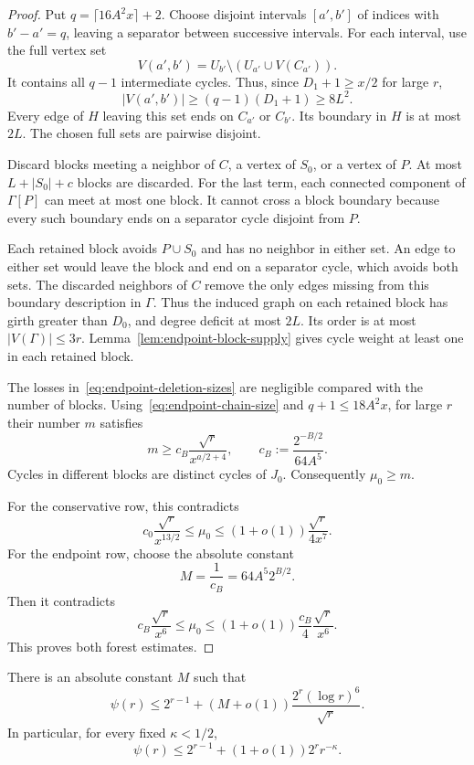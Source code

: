 \begin{proof}
Put $q=\lceil16A^2x\rceil+2$.
Choose disjoint intervals $[a',b']$ of indices with $b'-a'=q$, leaving a separator between successive intervals.
For each interval, use the full vertex set
\[
 V(a',b')=U_{b'}\setminus(U_{a'}\cup V(C_{a'})).
\]
It contains all $q-1$ intermediate cycles.
Thus, since $D_1+1\ge x/2$ for large $r$,
\[
 |V(a',b')|\ge(q-1)(D_1+1)\ge8L^2.
\]
Every edge of $H$ leaving this set ends on $C_{a'}$ or $C_{b'}$.
Its boundary in $H$ is at most $2L$.
The chosen full sets are pairwise disjoint.

Discard blocks meeting a neighbor of $C$, a vertex of $S_0$, or a vertex of $P$.
At most $L+|S_0|+c$ blocks are discarded.
For the last term, each connected component of $\Gamma[P]$ can meet at most one block.
It cannot cross a block boundary because every such boundary ends on a separator cycle disjoint from $P$.

Each retained block avoids $P\cup S_0$ and has no neighbor in either set.
An edge to either set would leave the block and end on a separator cycle, which avoids both sets.
The discarded neighbors of $C$ remove the only edges missing from this boundary description in $\Gamma$.
Thus the induced graph on each retained block has girth greater than $D_0$, and degree deficit at most $2L$.
Its order is at most $|V(\Gamma)|\le3r$.
Lemma~\ref{lem:endpoint-block-supply} gives cycle weight at least one in each retained block.

The losses in~\eqref{eq:endpoint-deletion-sizes} are negligible compared with the number of blocks.
Using~\eqref{eq:endpoint-chain-size} and $q+1\le18A^2x$, for large $r$ their number $m$ satisfies
\begin{equation}\label{eq:endpoint-clean-block-count}
 m\ge c_B\frac{\sqrt r}{x^{a/2+4}},
 \qquad c_B:=\frac{2^{-B/2}}{64A^5}.
\end{equation}
Cycles in different blocks are distinct cycles of $J_0$.
Consequently $\mu_0\ge m$.

For the conservative row, this contradicts
\[
 c_0\frac{\sqrt r}{x^{13/2}}
 \le\mu_0\le(1+o(1))\frac{\sqrt r}{4x^7}.
\]
For the endpoint row, choose the absolute constant
\[
 M=\frac1{c_B}=64A^5 2^{B/2}.
\]
Then it contradicts
\[
 c_B\frac{\sqrt r}{x^6}
 \le\mu_0\le(1+o(1))\frac{c_B}{4}\frac{\sqrt r}{x^6}.
\]
This proves both forest estimates.
\end{proof}

\begin{corollary}
\label{cor:parallel-links-endpoint-cycles}
There is an absolute constant $M$ such that
\[
 \psi(r)\le2^{r-1}+(M+o(1))\frac{2^r(\log r)^6}{\sqrt r}.
\]
In particular, for every fixed $\kappa<1/2$,
\[
 \psi(r)\le2^{r-1}+(1+o(1))2^r r^{-\kappa}.
\]
\end{corollary}

